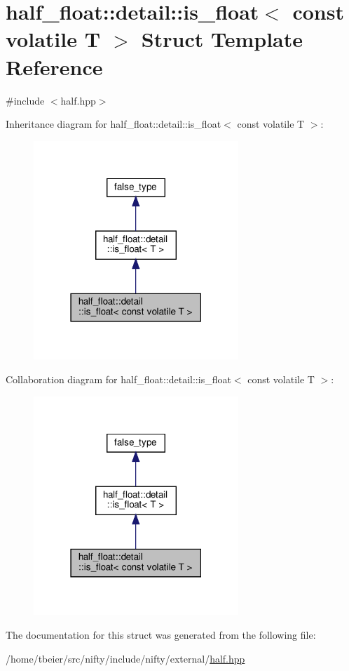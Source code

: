 \hypertarget{structhalf__float_1_1detail_1_1is__float_3_01const_01volatile_01T_01_4}{}\section{half\+\_\+float\+:\+:detail\+:\+:is\+\_\+float$<$ const volatile T $>$ Struct Template Reference}
\label{structhalf__float_1_1detail_1_1is__float_3_01const_01volatile_01T_01_4}


{\ttfamily \#include $<$half.\+hpp$>$}



Inheritance diagram for half\+\_\+float\+:\+:detail\+:\+:is\+\_\+float$<$ const volatile T $>$\+:
\nopagebreak
\begin{figure}[H]
\begin{center}
\leavevmode
\includegraphics[width=219pt]{structhalf__float_1_1detail_1_1is__float_3_01const_01volatile_01T_01_4__inherit__graph}
\end{center}
\end{figure}


Collaboration diagram for half\+\_\+float\+:\+:detail\+:\+:is\+\_\+float$<$ const volatile T $>$\+:
\nopagebreak
\begin{figure}[H]
\begin{center}
\leavevmode
\includegraphics[width=219pt]{structhalf__float_1_1detail_1_1is__float_3_01const_01volatile_01T_01_4__coll__graph}
\end{center}
\end{figure}


The documentation for this struct was generated from the following file\+:\begin{DoxyCompactItemize}
\item 
/home/tbeier/src/nifty/include/nifty/external/\hyperlink{half_8hpp}{half.\+hpp}\end{DoxyCompactItemize}
